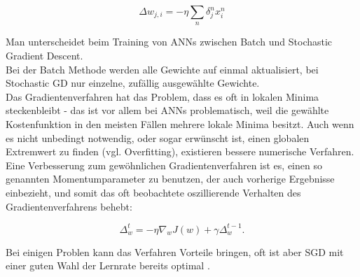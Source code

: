 \begin{equation}
\Delta w_{j,i} = - \eta  \sum_n \delta_j^n  x_i^n 
\end{equation}

\cite{bishop1995neural} 

Man unterscheidet beim Training von ANNs zwischen Batch und Stochastic Gradient Descent.\\

Bei der Batch Methode werden alle Gewichte auf einmal aktualisiert, bei Stochastic GD nur einzelne, zufällig ausgewählte Gewichte.\\

Das Gradientenverfahren hat das Problem, dass es oft in lokalen Minima steckenbleibt - das ist vor allem bei ANNs problematisch, weil die gewählte Kostenfunktion in den meisten Fällen mehrere lokale Minima besitzt. Auch wenn es nicht unbedingt notwendig, oder sogar erwünscht ist, einen globalen Extremwert zu finden (vgl. Overfitting), existieren bessere numerische Verfahren. \\

Eine Verbesserung zum gewöhnlichen Gradientenverfahren ist es, einen so genannten Momentumparameter zu benutzen, der auch vorherige Ergebnisse einbezieht, und somit das oft beobachtete oszillierende Verhalten des Gradientenverfahrens behebt:

\begin{equation}
 \Delta_w^t = - \eta  \nabla_w J(w) + \gamma \Delta_w^{t-1}.
\end{equation}

Bei einigen Problen kann das Verfahren Vorteile bringen, oft ist aber SGD mit einer guten Wahl der Lernrate bereits optimal \cite{bengio2012practical}.
